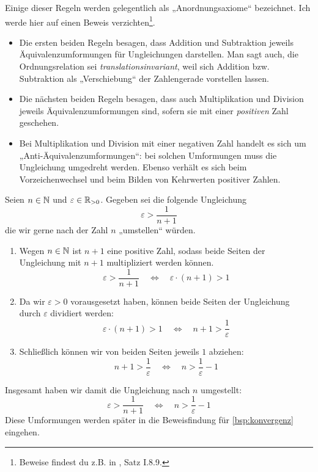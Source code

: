 \begin{bem} \label{ungleichungerklaerung}
    Einige dieser Regeln werden gelegentlich als „Anordnungsaxiome“ bezeichnet. Ich werde hier auf einen Beweis verzichten\footnote{Beweise findest du z.B. in \cite{AE06}, Satz I.8.9.}.
    \begin{itemize}
        \item Die ersten beiden Regeln besagen, dass Addition und Subtraktion jeweils Äquivalenz\-umformungen für Ungleichungen darstellen. Man sagt auch, die Ordnungsrelation sei \emph{translationsinvariant}, weil sich Addition bzw. Subtraktion als „Verschiebung“ der Zahlengerade vorstellen lassen.
        \item Die nächsten beiden Regeln besagen, dass auch Multiplikation und Division jeweils Äquivalenzumformungen sind, sofern sie mit einer \emph{positiven} Zahl geschehen.
        \item Bei Multiplikation und Division mit einer negativen Zahl handelt es sich um „Anti-Äquivalenzumformungen“: bei solchen Umformungen muss die Ungleichung umgedreht werden. Ebenso verhält es sich beim Vorzeichenwechsel und beim Bilden von Kehrwerten positiver Zahlen.
    \end{itemize}
\end{bem}


\begin{bsp} \label{bsp:ungleichungumstellen}
    Seien $n\in \mathbb N$ und $\varepsilon \in \mathbb R_{>0}$. Gegeben sei die folgende Ungleichung
        \[ \varepsilon > \frac{1}{n+1} \]
    die wir gerne nach der Zahl $n$ „umstellen“ würden.
    \begin{enumerate}
        \item Wegen $n\in \mathbb N$ ist $n+1$ eine positive Zahl, sodass beide Seiten der Ungleichung mit $n+1$ multipliziert werden können.
            \[ \varepsilon  > \frac{1}{n+1} \quad\iff\quad \varepsilon \cdot (n+1) > 1\]
        \item Da wir $\varepsilon>0$ vorausgesetzt haben, können beide Seiten der Ungleichung durch $\varepsilon$ dividiert werden:
            \[ \varepsilon \cdot (n+1) > 1 \quad\iff\quad n+1 > \frac{1}{\varepsilon} \]
        \item Schließlich können wir von beiden Seiten jeweils $1$ abziehen:
            \[ n+1 > \frac{1}{\varepsilon} \quad\iff\quad n > \frac{1}{\varepsilon}-1 \]
    \end{enumerate}
    Insgesamt haben wir damit die Ungleichung nach $n$ umgestellt:
        \[ \varepsilon > \frac{1}{n+1} \quad\iff\quad n > \frac{1}{\varepsilon}-1 \]
    Diese Umformungen werden später in die Beweisfindung für \cref{bsp:konvergenz} eingehen.
\end{bsp}


